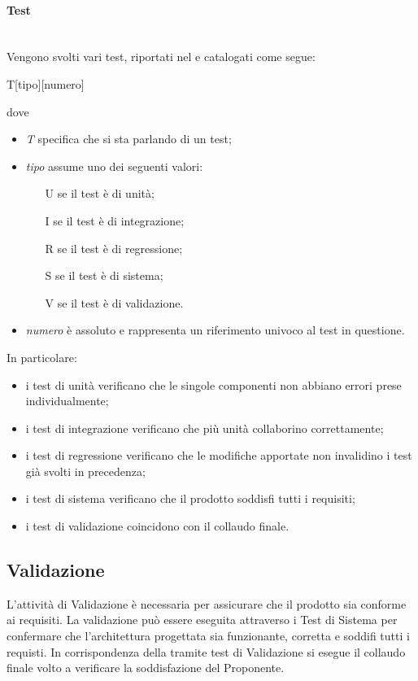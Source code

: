 \paragraph{Test}\mbox{}\\
Vengono svolti vari test, riportati nel \PianoDiQualifica{} e catalogati come segue:
\begin{center}
	T[tipo][numero]
\end{center}
dove
\begin{itemize}
	\item \textit{T} specifica che si sta parlando di un test;
	\item \textit{tipo} assume uno dei seguenti valori:
	\begin{itemize}
		\item [U] se il test è di unità;
		\item [I] se il test è di integrazione;
		\item [R] se il test è di regressione;
		\item [S] se il test è di sistema;
		\item [V] se il test è di validazione.
	\end{itemize}
	\item \textit{numero} è assoluto e rappresenta un riferimento univoco al test in questione.
\end{itemize}
In particolare:
\begin{itemize}
	\item i test di unità verificano che le singole componenti non abbiano errori prese individualmente;
	\item i test di integrazione verificano che più unità collaborino correttamente;
	\item i test di regressione verificano che le modifiche apportate non invalidino i test già svolti in precedenza;
	\item i test di sistema verificano che il prodotto soddisfi tutti i requisiti;
	\item i test di validazione coincidono con il collaudo finale.
\end{itemize}

\subsection{Validazione}
L’attività di Validazione è necessaria per assicurare che il prodotto sia conforme ai requisiti.
La validazione può essere eseguita attraverso i Test di Sistema per confermare che l'architettura progettata sia funzionante, corretta e soddifi tutti i requisti. 
In corrispondenza della \RA{} tramite test di Validazione si esegue il collaudo finale volto a verificare la soddisfazione del Proponente.


